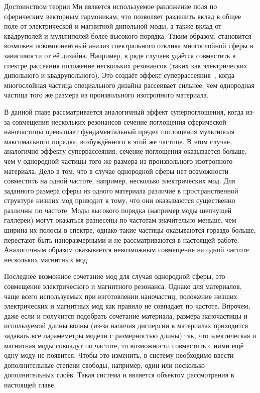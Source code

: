 Достоинством теории Ми является используемое разложение поля по
сферическим векторным гармоникам, что позволяет разделить вклад в
общее поле от электрической и магнитной дипольной моды, а также вклад
от квадруполей и мультиполей более высокого порядка. Таким образом,
становится возможен покомпонентный анализ спектрального отклика
многослойной сферы в зависимости от её дизайна. Например, в ряде
случаев удаётся совместить в спектре рассеяния положение нескольких
резонансов (таких как электрических дипольного и квадрупольного). Это
создаёт эффект суперрассеяния~\cite{Fan-2010,Fan-2011}, когда
многослойная частица специального дизайна рассеивает сильнее, чем
однородная частица того же размера из произвольного изотропного
материала.

В данной главе рассматривается аналогичный эффект суперпоглощения,
когда из-за совмещения нескольких резонансов сечение поглощения
сферической наночастицы превышает фундаментальный предел поглощения
мультиполя максимального порядка, возбуждённого в этой же частице.  В
этом случае, аналогично эффекту суперрассеяния, сечение поглощения
оказывается больше, чем у однородной частицы того же размера из
произвольного изотропного материала. Дело в том, что в случае
однородной сферы нет возможности совместить на одной частоте,
например, несколько электрических мод. Для заданного размера сферы из
одного материала различие в пространственной структуре низших мод
приводит к тому, что они оказываются существенно различны по
частоте. Моды высокого порядка (например моды шепчущей галлереи) могут
оказаться разнесены по частотам значительно меньше, чем ширина их
полосы в спектре, однако такие частицы оказываются гораздо больше,
перестают быть наноразмерными и не рассматриваются в настоящей
работе. Аналогичным образом оказывается невозможным совмещение на
одной частоте нескольких магнитных мод.

Последнее возможное сочетание мод для случая однородной сферы, это
совмещение электрического и магнитного резонанса. Однако для
материалов, чаще всего используемых при изготовлении наночастиц,
положение низших электрических и магнитных мод как правило не
совпадает по частоте.  Впрочем, даже если и получится подобрать
сочетание материала, размера наночастицы и используемой длины волны
(из-за наличия дисперсии в материалах приходится задавать все
парамеметры модели с размерностью длины) так, что электическая и
магнитная моды совпадут по частоте, то возможности совместить с ними
ещё одну моду не появится.  Чтобы это изменить, в систему необходимо
ввести дополнительные степени свободы, например, один или несколько
дополнительных слоёв. Такая система и является объектом рассмотрения в
настоящей главе.

